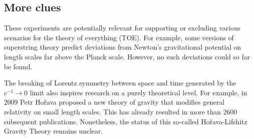\subsection*{More clues}

These experiments are potentially relevant for supporting or excluding various scenarios for the theory of everything (TOE). For example, some versions of superstring theory predict deviations from Newton's gravitational potential on length scales far above the Planck scale. However, no such deviations could so far be found.

The breaking of Lorentz symmetry between space and time generated by the $c^{−1}\rightarrow 0$ limit also inspires research on a purely theoretical level. For example, in 2009 Petr Hořava proposed a new theory of gravity that modifies general relativity on small length scales. This has already resulted in more than \num{2600} subsequent publications. Nonetheless, the status of this so-called Hořava-Lifshitz Gravity Theory remains unclear.
